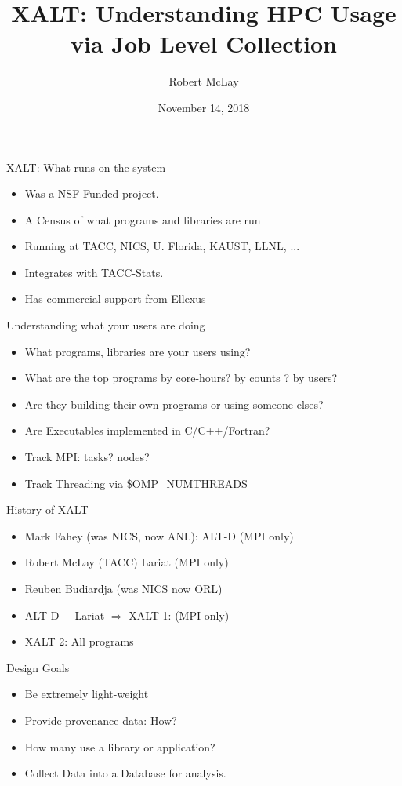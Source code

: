 \documentclass{beamer}
\begin{document}
\title[XALT]{XALT: Understanding HPC Usage via Job Level Collection}
\author{Robert McLay} 
\date{November 14, 2018} 

\frame{\titlepage} 

\begin{frame}{XALT: What runs on the system}
  \begin{itemize}
    \item Was a NSF Funded project.
    \item A Census of what programs and libraries are run
    \item Running at TACC, NICS, U. Florida, KAUST, LLNL, ...
    \item Integrates with TACC-Stats.
    \item Has commercial support from Ellexus 
  \end{itemize}
\end{frame}

\begin{frame}{Understanding what your users are doing}
  \begin{itemize}
    \item What programs, libraries are your users using?
    \item What are the top programs by core-hours? by counts ? by users?
    \item Are they building their own programs or using someone elses?
    \item Are Executables implemented in C/C++/Fortran?
    \item Track MPI: tasks? nodes?
    \item Track Threading via \$OMP\_NUMTHREADS
  \end{itemize}
\end{frame}

\begin{frame}{History of XALT}
  \begin{itemize}
    \item Mark Fahey (was NICS, now ANL): ALT-D (MPI only)
    \item Robert McLay (TACC) Lariat (MPI only)
    \item Reuben Budiardja (was NICS now ORL)
    \item ALT-D $+$ Lariat $\Rightarrow$ XALT 1: (MPI only)
    \item XALT 2: All programs
  \end{itemize}
\end{frame}

\begin{frame}{Design Goals}
  \begin{itemize}
    \item Be extremely light-weight
    \item Provide provenance data: How?
    \item How many use a library or application?
    \item Collect Data into a Database for analysis.
  \end{itemize}
\end{frame}
\end{document}
